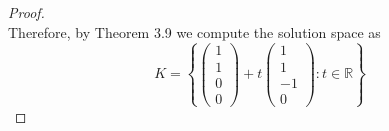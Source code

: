 \documentclass[11pt]{scrartcl}
\begin{document}
\begin{enumerate}[label=\alph*.]
{\begin{proof}
$$		      $$
		      Therefore, by Theorem 3.9 we compute the solution space as
		      \[
			      K=
			      \left\{
			      \begin{pmatrix}
				      1 \\
				      1 \\
				      0 \\
				      0
			      \end{pmatrix}+
			      t\begin{pmatrix}
				      1  \\
				      1 \\
				      -1  \\
				      0
			      \end{pmatrix}: t \in \mathbb{R}
			      \right\}
		      \]
	      \end{proof}
	      }
\end{enumerate}

\section{}
\end{document}
